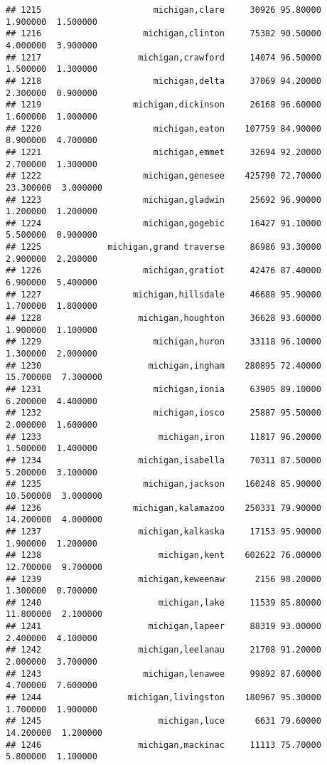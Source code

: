 \documentclass[
]{article}
\begin{document}
\begin{verbatim}
## 1215                      michigan,clare     30926 95.80000  1.900000  1.500000
## 1216                    michigan,clinton     75382 90.50000  4.000000  3.900000
## 1217                   michigan,crawford     14074 96.50000  1.500000  1.300000
## 1218                      michigan,delta     37069 94.20000  2.300000  0.900000
## 1219                  michigan,dickinson     26168 96.60000  1.600000  1.000000
## 1220                      michigan,eaton    107759 84.90000  8.900000  4.700000
## 1221                      michigan,emmet     32694 92.20000  2.700000  1.300000
## 1222                    michigan,genesee    425790 72.70000 23.300000  3.000000
## 1223                    michigan,gladwin     25692 96.90000  1.200000  1.200000
## 1224                    michigan,gogebic     16427 91.10000  5.500000  0.900000
## 1225             michigan,grand traverse     86986 93.30000  2.900000  2.200000
## 1226                    michigan,gratiot     42476 87.40000  6.900000  5.400000
## 1227                  michigan,hillsdale     46688 95.90000  1.700000  1.800000
## 1228                   michigan,houghton     36628 93.60000  1.900000  1.100000
## 1229                      michigan,huron     33118 96.10000  1.300000  2.000000
## 1230                     michigan,ingham    280895 72.40000 15.700000  7.300000
## 1231                      michigan,ionia     63905 89.10000  6.200000  4.400000
## 1232                      michigan,iosco     25887 95.50000  2.000000  1.600000
## 1233                       michigan,iron     11817 96.20000  1.500000  1.400000
## 1234                   michigan,isabella     70311 87.50000  5.200000  3.100000
## 1235                    michigan,jackson    160248 85.90000 10.500000  3.000000
## 1236                  michigan,kalamazoo    250331 79.90000 14.200000  4.000000
## 1237                   michigan,kalkaska     17153 95.90000  1.900000  1.200000
## 1238                       michigan,kent    602622 76.00000 12.700000  9.700000
## 1239                   michigan,keweenaw      2156 98.20000  1.300000  0.700000
## 1240                       michigan,lake     11539 85.80000 11.800000  2.100000
## 1241                     michigan,lapeer     88319 93.00000  2.400000  4.100000
## 1242                   michigan,leelanau     21708 91.20000  2.000000  3.700000
## 1243                    michigan,lenawee     99892 87.60000  4.700000  7.600000
## 1244                 michigan,livingston    180967 95.30000  1.700000  1.900000
## 1245                       michigan,luce      6631 79.60000 14.200000  1.200000
## 1246                   michigan,mackinac     11113 75.70000  5.800000  1.100000

\end{verbatim}
\end{document}
